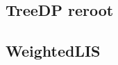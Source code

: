    \subsection{TreeDP reroot}
         \columnbreak
    \subsection{WeightedLIS}
        
\clearpage

%     
    

%         
